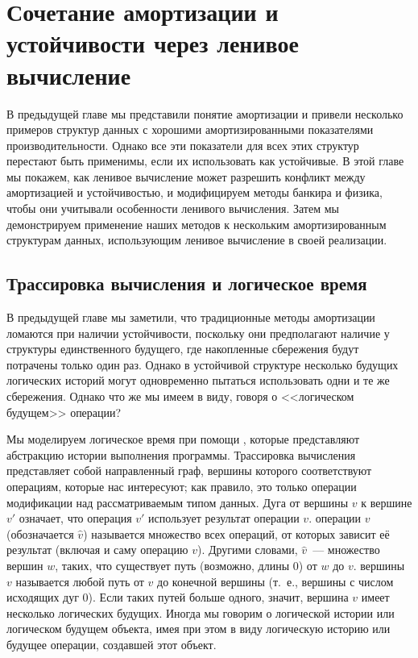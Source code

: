 \chapter{Сочетание амортизации и устойчивости через ленивое
  вычисление}
\label{ch:6}

В предыдущей главе мы представили понятие амортизации и привели
несколько примеров структур данных с хорошими амортизированными
показателями производительности. Однако все эти показатели для всех этих
структур перестают быть применимы, если их использовать как
устойчивые. В этой главе мы покажем, как ленивое вычисление может
разрешить конфликт между амортизацией и устойчивостью, и модифицируем
методы банкира и физика, чтобы они учитывали особенности ленивого
вычисления. Затем мы демонстрируем применение наших методов к
нескольким амортизированным структурам данных, использующим ленивое
вычисление в своей реализации.

\section{Трассировка вычисления и логическое время}
\label{sc:6.1}

В предыдущей главе мы заметили, что традиционные методы амортизации
ломаются при наличии устойчивости, поскольку они предполагают наличие
у структуры единственного будущего, где накопленные сбережения будут
потрачены только один раз. Однако в устойчивой структуре несколько
будущих логических историй могут одновременно пытаться
использовать одни и те же сбережения. Однако что же мы имеем в виду,
говоря о <<логическом будущем>> операции?

Мы моделируем логическое время при помощи , которые представляют абстракцию
истории выполнения программы. Трассировка вычисления представляет собой
направленный граф, вершины которого соответствуют операциям, которые
нас интересуют; как правило, это только операции модификации над
рассматриваемым типом данных. Дуга от вершины $v$ к вершине $v'$
означает, что операция $v'$ использует результат операции
$v$.  операции $v$
(обозначается $\hat{v}$) называется
множество всех операций, от которых зависит её результат (включая и
саму операцию $v$). Другими словами, $\hat{v}$~--- множество вершин
$w$, таких, что существует путь (возможно, длины 0) от $w$ до $v$.
 вершины $v$ называется любой
путь от $v$ до конечной вершины (т.~е., вершины с числом исходящих дуг
0). Если таких путей больше одного, значит, вершина $v$ имеет
несколько логических будущих. Иногда мы говорим о логической истории
или логическом будущем объекта, имея при этом в виду логическую
историю или будущее операции, создавшей этот объект.

